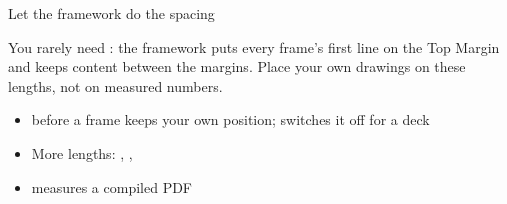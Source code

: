 \begin{standardframe}{Let the framework do the spacing}
\begin{minipage}[t]{0.5\linewidth}
	\end{minipage}\hfill
	\begin{minipage}[t]{0.46\linewidth}\vspace{0pt}
		{\small\SMLineTop You rarely need : the framework puts every
		frame's first line on the Top Margin and keeps content between the
		margins. Place your own drawings on these lengths, not on measured
		numbers.\par}
		\medskip
		\begin{itemize}
			\item {} before a frame keeps your own position;  switches it off for a deck
			\item More lengths: , , 
			\item {} measures a compiled PDF
		\end{itemize}
	\end{minipage}
\end{standardframe}
